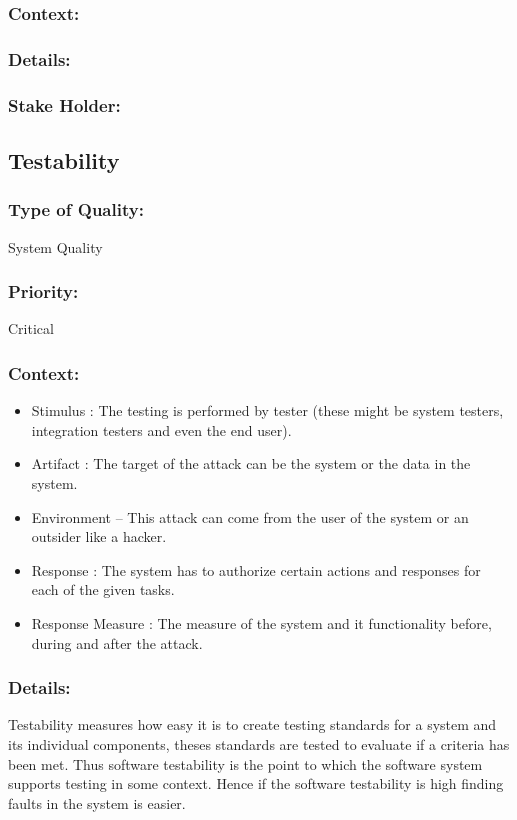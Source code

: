 \documentclass[11pt]{article}
\begin{document}
		\subsubsection{Context:}
			\textbf{}
		
		\subsubsection{Details:}
			\textbf{}
		
		\subsubsection{Stake Holder:}
			\textbf{}
	
	\subsection{Testability}
	
		\subsubsection{Type of Quality:}
			\textbf{} System Quality
		
		\subsubsection{Priority:}
			\textbf{} Critical

		\subsubsection{Context:}
		\begin{itemize}
			\item Stimulus : The testing is performed by tester (these might be system testers, integration testers and even the end user).
			\item Artifact : The target of the attack can be the system or the data in the system.
			\item Environment – This attack can come from the user of the system or an outsider like a hacker. 
			\item Response : The system has to authorize certain actions and responses for each of the given tasks.
			\item Response Measure : The measure of the system and it functionality before, during and after the attack.
		\end{itemize}
		
		\subsubsection{Details:}
			\textbf{}Testability measures how easy it is to create testing standards for a system and its individual components, theses standards are tested to evaluate if a criteria has been met. Thus software testability is the point to which the software system supports testing in some context. Hence if the software testability is high finding faults in the system is easier.
		
\end{document}
